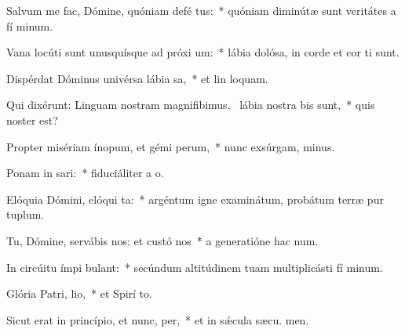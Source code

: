 \item Salvum me fac, Dómine, quóniam defé tus:~* quóniam diminútæ sunt veritátes a fí minum.
\item Vana locúti sunt unusquísque ad próxi um:~* lábia dolósa, in corde et cor ti sunt.
\item Dispérdat Dóminus univérsa lábia sa,~* et lin loquam.
\item Qui dixérunt: Linguam nostram magnifibimus,~\pscross{} lábia nostra  bis sunt,~* quis noster  est?
\item Propter misériam ínopum, et gémi perum,~* nunc exsúrgam,  minus.
\item Ponam in sari:~* fiduciáliter a  o.
\item Elóquia Dómini, elóqui ta:~* argéntum igne examinátum, probátum terræ pur tuplum.
\item Tu, Dómine, servábis nos: et custó nos~* a generatióne hac  num.
\item In circúitu ímpi bulant:~* secúndum altitúdinem tuam multiplicásti fí minum.
\item Glória Patri,  lio,~* et Spirí to.
\item Sicut erat in princípio, et nunc,  per,~* et in sǽcula sæcu. men.
